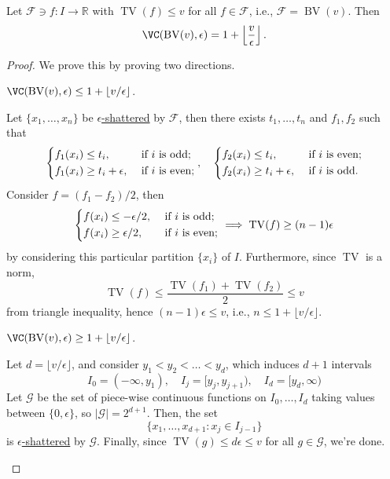 \begin{lemma}
	Let \(\mathscr{F}\ni f \colon I \to \mathbb{R} \) with \(\mathop{\mathrm{TV}}(f) \leq v\) for all \(f \in \mathscr{F} \), i.e., \(\mathscr{F} = \mathop{\mathrm{BV}}(v) \). Then
	\[
		\VC(\mathop{\mathrm{BV}}(v) , \epsilon ) = 1 + \left\lfloor \frac{v}{\epsilon } \right\rfloor.
	\]
\end{lemma}
\begin{proof}
	We prove this by proving two directions.
	\begin{claim}
		\(\VC(\mathop{\mathrm{BV}}(v) , \epsilon ) \leq 1 + \lfloor v / \epsilon \rfloor\).
	\end{claim}
	\begin{explanation}
		Let \(\{ x_1, \dots , x_n \} \) be \hyperref[def:eps-shattered]{\(\epsilon\)-shattered} by \(\mathscr{F} \), then there exists \(t_1, \dots , t_n\) and \(f_1, f_2\) such that
		\[
			\begin{dcases}
				f_1(x_i) \leq t_i,             & \text{ if \(i\) is odd} ;  \\
				f_1(x_i) \geq t_i + \epsilon , & \text{ if \(i\) is even} ;
			\end{dcases},\quad
			\begin{dcases}
				f_2(x_i) \leq t_i,             & \text{ if \(i\) is even} ; \\
				f_2(x_i) \geq t_i + \epsilon , & \text{ if \(i\) is odd} .
			\end{dcases}
		\]
		Consider \(f = (f_1 - f_2) / 2\), then
		\[
			\begin{dcases}
				f(x_i) \leq - \epsilon / 2, & \text{ if \(i\) is odd} ;  \\
				f(x_i) \geq \epsilon / 2 ,  & \text{ if \(i\) is even} ;
			\end{dcases}
			\implies \mathop{\mathrm{TV}}(f) \geq (n-1) \epsilon
		\]
		by considering this particular partition \(\{ x_i \}\) of \(I\). Furthermore, since \(\mathop{\mathrm{TV}} \) is a norm,
		\[
			\mathop{\mathrm{TV}}(f) \leq \frac{\mathop{\mathrm{TV}}(f_1) + \mathop{\mathrm{TV}}(f_2) }{2} \leq v
		\]
		from triangle inequality, hence \((n-1) \epsilon \leq v\), i.e., \(n \leq 1 + \lfloor v / \epsilon  \rfloor\).
	\end{explanation}

	\begin{claim}
		\(\VC(\mathop{\mathrm{BV}}(v) , \epsilon ) \geq 1 + \lfloor v / \epsilon \rfloor\).
	\end{claim}
	\begin{explanation}
		Let \(d = \lfloor v / \epsilon \rfloor\), and consider \(y_1 < y_2 < \dots < y_d\), which induces \(d+1\) intervals
		\[
			I_0 = (-\infty , y_1), \quad I_j = [y_j, y_{j+1}), \quad I_d = [y_d, \infty )
		\]
		Let \(\mathcal{G} \) be the set of piece-wise continuous functions on \(I_0, \dots , I_d\) taking values between \(\{ 0, \epsilon  \} \), so \(\vert \mathcal{G} \vert = 2^{d+1}\). Then, the set
		\[
			\{ x_1, \dots , x_{d+1} \colon x_j \in I_{j-1}\}
		\]
		is \hyperref[def:eps-shattered]{\(\epsilon\)-shattered} by \(\mathcal{G} \). Finally, since \(\mathop{\mathrm{TV}}(g) \leq d\epsilon \leq v\) for all \(g\in \mathcal{G} \), we're done.
	\end{explanation}
\end{proof}

